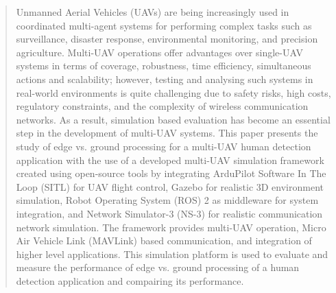 \begin{abstract}
Unmanned Aerial Vehicles (UAVs) are being increasingly used in coordinated multi-agent systems for performing complex tasks such as surveillance, disaster response, environmental monitoring, and precision agriculture. Multi-UAV operations offer advantages over single-UAV systems in terms of coverage, robustness, time efficiency, simultaneous actions and scalability; however, testing and analysing such systems in real-world environments is quite challenging due to safety risks, high costs, regulatory constraints, and the complexity of wireless communication networks. As a result, simulation based evaluation has become an essential step in the development of multi-UAV systems.
This paper presents the study of edge vs. ground processing for a multi-UAV human detection application with the use of a developed multi-UAV simulation framework created using open-source tools by integrating ArduPilot Software In The Loop (SITL) for UAV flight control, Gazebo for realistic 3D environment simulation, Robot Operating System (ROS) 2 as middleware for system integration, and Network Simulator-3 (NS-3) for realistic communication network simulation. The framework provides multi-UAV operation, Micro Air Vehicle Link (MAVLink) based communication, and integration of higher level applications. This simulation platform is used to evaluate and measure the performance of edge vs. ground processing of a human detection application and compairing its performance.
\end{abstract}